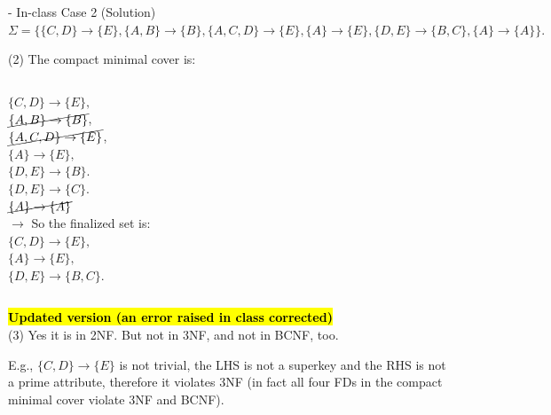 \begin{frame}[fragile]{ - In-class Case 2 (Solution)}
	$\Sigma=\{\{C,D\} \rightarrow \{E\},\{A,B\} \rightarrow \{B\}, \{A,C,D\} \rightarrow \{E\},\{A\} \rightarrow \{E\},\{D,E\} \rightarrow \{B,C\},\{A\} \rightarrow \{A\}\}.$\\\vspace{5pt}
	
	(2) The compact minimal cover is:\\\vspace{5pt}
	
	\begin{columns}
	$\{C,D\} \rightarrow \{E\},$\\
	$\cancel{\{A,B\} \rightarrow \{B\}}$,\\
	$\cancel{\{A,C,D\} \rightarrow \{E\}}$,\\
	$\{A\}  \rightarrow \{E\},$\\
	$\{D,E\} \rightarrow \{B\}.$\\
	$\{D,E\} \rightarrow \{C\}.$\\
	$\cancel{\{A\} \rightarrow \{A\}}$\\\vspace{5pt}
	 $\rightarrow$
	So the finalized set is:\\
	$\{C,D\} \rightarrow \{E\},$\\
	$\{A\}  \rightarrow \{E\},$\\
	$\{D,E\} \rightarrow \{B, C\}.$
	\end{columns}
	
	\textcolor{red}{\textbf{\hl{Updated version (an error raised in class corrected)}}}\\
	(3)  Yes it is in 2NF. But not in 3NF, and not in BCNF, too.\\\vspace{5pt}
	
	E.g., $\{C,D\} \rightarrow \{E\}$ is not trivial, the LHS is not a superkey and the RHS is not a prime attribute, therefore it violates 3NF (in fact all four FDs in the compact minimal cover violate 3NF and BCNF).
	
\end{frame}


